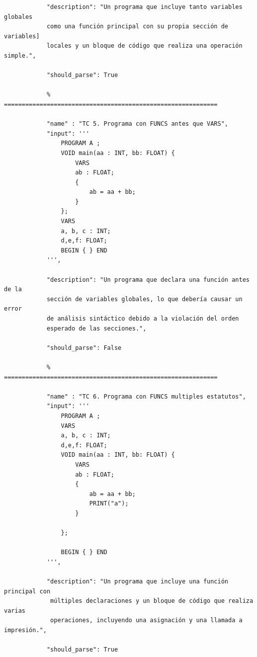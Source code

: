 \documentclass[12pt, letterpaper]{article}
\theoremstyle{definition}
\begin{document}
\begin{verbatim}
            "description": "Un programa que incluye tanto variables globales
            como una función principal con su propia sección de variables]
            locales y un bloque de código que realiza una operación simple.",
           
            "should_parse": True
      
            % ============================================================

            "name" : "TC 5. Programa con FUNCS antes que VARS",
            "input": '''
                PROGRAM A ;
                VOID main(aa : INT, bb: FLOAT) {                    
                    VARS
                    ab : FLOAT;
                    {                        
                        ab = aa + bb;
                    }
                };
                VARS 
                a, b, c : INT;
                d,e,f: FLOAT;
                BEGIN { } END
            ''',
            
            "description": "Un programa que declara una función antes de la 
            sección de variables globales, lo que debería causar un error 
            de análisis sintáctico debido a la violación del orden
            esperado de las secciones.",
            
            "should_parse": False
       
            % ============================================================

            "name" : "TC 6. Programa con FUNCS multiples estatutos",
            "input": '''
                PROGRAM A ;
                VARS 
                a, b, c : INT;
                d,e,f: FLOAT;
                VOID main(aa : INT, bb: FLOAT) {                    
                    VARS
                    ab : FLOAT;
                    {                        
                        ab = aa + bb;
                        PRINT("a");
                    }
                    
                }; 
                                
                BEGIN { } END
            ''',

            "description": "Un programa que incluye una función principal con
             múltiples declaraciones y un bloque de código que realiza varias
             operaciones, incluyendo una asignación y una llamada a impresión.",

            "should_parse": True
       

\end{verbatim}
\end{document}
